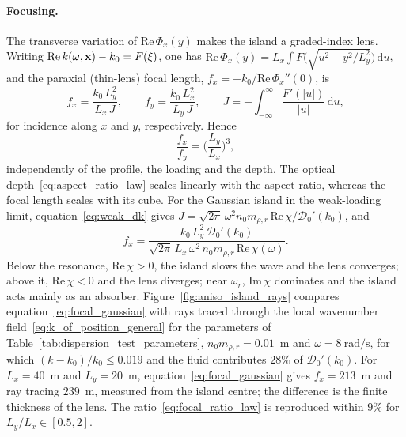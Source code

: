\paragraph{Focusing.} The transverse variation of $\mathrm{Re}\,\Phi_x(y)$ makes the island a graded-index lens. Writing $\mathrm{Re}\,k(\omega,\mathbf{x})-k_0=F(\xi)$, one has $\mathrm{Re}\,\Phi_x(y)=L_x\int F\big(\sqrt{u^2+y^2/L_y^2}\big)\,\mathrm{d}u$, and the paraxial (thin-lens) focal length, $f_x=-k_0/\mathrm{Re}\,\Phi_x''(0)$, is
\begin{equation}\label{eq:focal_general}
    f_x=\frac{k_0\,L_y^2}{L_x\,J},
    \qquad
    f_y=\frac{k_0\,L_x^2}{L_y\,J},
    \qquad
    J=-\int_{-\infty}^{\infty}\frac{F'(|u|)}{|u|}\,\mathrm{d}u,
\end{equation}
for incidence along $x$ and $y$, respectively. Hence
\begin{equation}\label{eq:focal_ratio_law}
    \frac{f_x}{f_y}=\Big(\frac{L_y}{L_x}\Big)^3,
\end{equation}
independently of the profile, the loading and the depth. The optical depth~\eqref{eq:aspect_ratio_law} scales linearly with the aspect ratio, whereas the focal length scales with its cube. For the Gaussian island in the weak-loading limit, equation~\eqref{eq:weak_dk} gives $J=\sqrt{2\pi}\,\omega^2n_0m_{\rho,r}\,\mathrm{Re}\,\chi/\mathcal D_0'(k_0)$, and
\begin{equation}\label{eq:focal_gaussian}
    f_x=\frac{k_0\,L_y^2\,\mathcal D_0'(k_0)}{\sqrt{2\pi}\,L_x\,\omega^2\,n_0m_{\rho,r}\,\mathrm{Re}\,\chi(\omega)} .
\end{equation}
Below the resonance, $\mathrm{Re}\,\chi>0$, the island slows the wave and the lens converges; above it, $\mathrm{Re}\,\chi<0$ and the lens diverges; near $\omega_r$, $\mathrm{Im}\,\chi$ dominates and the island acts mainly as an absorber. Figure~\ref{fig:aniso_island_rays} compares equation~\eqref{eq:focal_gaussian} with rays traced through the local wavenumber field~\eqref{eq:k_of_position_general} for the parameters of Table~\ref{tab:dispersion_test_parameters}, $n_0m_{\rho,r}=0.01$~m and $\omega=8~\si{\radian\per\second}$, for which $(k-k_0)/k_0\le0.019$ and the fluid contributes $28\%$ of $\mathcal D_0'(k_0)$. For $L_x=40$~m and $L_y=20$~m, equation~\eqref{eq:focal_gaussian} gives $f_x=213$~m and ray tracing $239$~m, measured from the island centre; the difference is the finite thickness of the lens. The ratio~\eqref{eq:focal_ratio_law} is reproduced within $9\%$ for $L_y/L_x\in[0.5,2]$.

